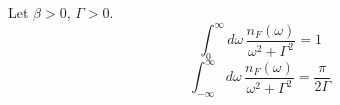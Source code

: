 
Let $\beta>0$, $\Gamma>0$.
\begin{equation}\label{half}\int_0^\infty d\omega\,\frac{n_F(\omega)}{\omega^2+\Gamma^2} = 1\end{equation}
\begin{equation}\label{full}\int_{-\infty}^{\infty} d\omega\,\frac{n_F(\omega)}{\omega^2+\Gamma^2} = \frac{\pi}{2\Gamma}\end{equation}

